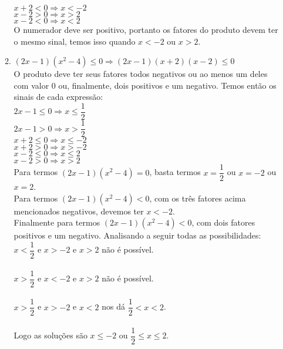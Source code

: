 \begin{enumerate}
\begin{enumerate}
			$x + 2 < 0 \Rightarrow x < -2$\\
			$x - 2 > 0 \Rightarrow x > 2$\\
			$x - 2 < 0 \Rightarrow x < 2$\\
			O numerador deve ser positivo, portanto os fatores do produto devem ter o mesmo sinal, temos isso quando $x < -2$ ou $x > 2$.
			\item %
			$(2x - 1)(x^2 - 4) \leq 0 \Rightarrow (2x - 1)(x + 2)(x - 2) \leq 0$\\
			O produto deve ter seus fatores todos negativos ou ao menos um deles com valor 0 ou, finalmente, dois positivos e um negativo. Temos então os sinais de cada expressão:\\
			$2x - 1 \leq 0 \Rightarrow x \leq \dfrac{1}{2}$\\
			$2x - 1 > 0 \Rightarrow x > \dfrac{1}{2}$\\
			$x + 2 \leq 0 \Rightarrow x \leq -2$\\
			$x + 2 > 0 \Rightarrow x > -2$\\
			$x - 2 \leq 0 \Rightarrow x \leq 2$\\
			$x - 2 > 0 \Rightarrow x > 2$\\
			Para termos $(2x - 1)(x^2 - 4) = 0$, basta termos $x = \dfrac{1}{2}$ ou $x = -2$ ou $x = 2$.\\
			Para termos $(2x - 1)(x^2 - 4) < 0$, com os três fatores acima mencionados negativos, devemos ter $x < -2$.\\
			Finalmente para termos $(2x - 1)(x^2 - 4) < 0$, com dois fatores positivos e um negativo. Analisando a seguir todas as possibilidades:\\
			$x < \dfrac{1}{2}$ e $x > -2$ e $x > 2$ não é possível.\\\\
			$x > \dfrac{1}{2}$ e $x < -2$ e $x > 2$ não é possível.\\\\
			$x > \dfrac{1}{2}$ e $x > -2$ e $x < 2$ nos dá  $\dfrac{1}{2} < x < 2$.\\\\
			Logo as soluções são  $x \leq -2$ ou $\dfrac{1}{2} \leq x \leq 2$.
			

\end{enumerate}
\end{enumerate}
